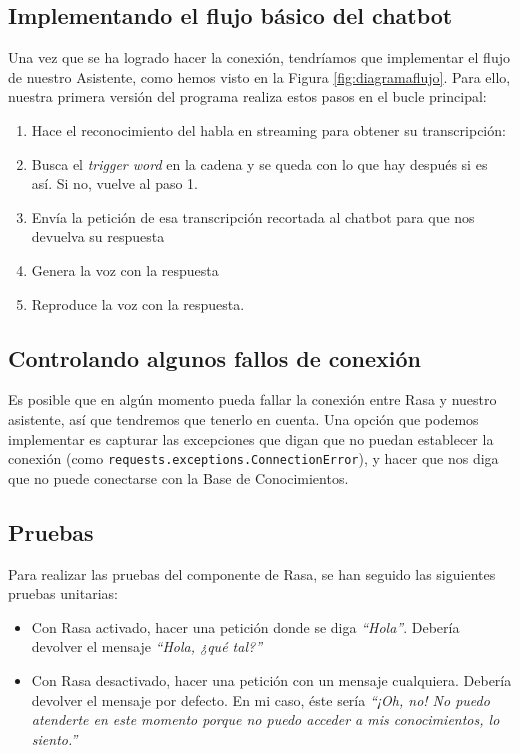 \subsection{Implementando el flujo básico del chatbot}
Una vez que se ha logrado hacer la conexión, tendríamos que implementar el flujo de nuestro Asistente, como hemos visto en la Figura \ref{fig:diagramaflujo}. Para ello, nuestra primera versión del programa realiza estos pasos en el bucle principal:
\begin{enumerate}
	\item Hace el reconocimiento del habla en streaming para obtener su transcripción:
	\item Busca el \textit{trigger word} en la cadena y se queda con lo que hay después si es así. Si no, vuelve al paso 1.
	\item Envía la petición de esa transcripción recortada al chatbot para que nos devuelva su respuesta
	\item Genera la voz con la respuesta
	\item Reproduce la voz con la respuesta. 
\end{enumerate}



\subsection{Controlando algunos fallos de conexión}
Es posible que en algún momento pueda fallar la conexión entre Rasa y nuestro asistente, así que tendremos que tenerlo en cuenta. Una opción que podemos implementar es capturar las excepciones que digan que no puedan establecer la conexión (como \texttt{requests.exceptions.ConnectionError}), y hacer que nos diga que no puede conectarse con la Base de Conocimientos.

\subsection{Pruebas}
Para realizar las pruebas  del componente de Rasa, se han seguido las siguientes pruebas unitarias:
\begin{itemize}
	\item Con Rasa activado, hacer una petición donde se diga \textit{``Hola''}. Debería devolver el mensaje \textit{``Hola, ¿qué tal?''}
	\item Con Rasa desactivado, hacer una petición con un mensaje cualquiera. Debería devolver el mensaje por defecto. En mi caso, éste sería \textit{``¡Oh, no! No puedo atenderte en este momento porque no puedo acceder a mis conocimientos, lo siento.''}
\end{itemize}

